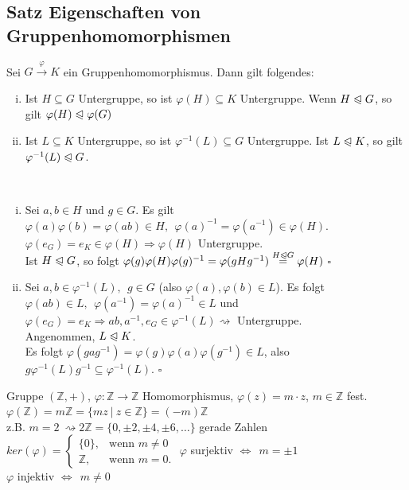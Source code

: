 \subsection{Satz Eigenschaften von Gruppenhomomorphismen}
\label{sub:satz_eigenschaften}
Sei $G\stackrel{\varphi}{\to}K $ ein Gruppenhomomorphismus. Dann gilt folgendes:
\begin{enumerate}[(i)]
	\item Ist $H\subseteq G$ Untergruppe, so ist $\varphi(H) \subseteq K$ Untergruppe. Wenn $H\trianglelefteqslant G$, so gilt $\varphi(H)\trianglelefteqslant\varphi(G)$
	\item Ist $L\subseteq K$ Untergruppe, so ist $\varphi^{-1}(L) \subseteq G$ Untergruppe. Ist $L\trianglelefteqslant K$, so gilt $\varphi^{-1}(L) \trianglelefteqslant G$.
\end{enumerate}
\newpage
{}\\
\begin{enumerate}[(i)]
	\item Sei $a,b\in H$ und $g\in G$. Es gilt $\varphi(a)\varphi(b)=\varphi(ab)\in H,~~\varphi(a)^{-1}=\varphi(a^{-1})\in \varphi(H) $. $\varphi(e_G)=e_K \in \varphi(H) \Rightarrow \varphi(H)$ Untergruppe.\\
	Ist $H\trianglelefteqslant G$, so folgt $\varphi(g)\varphi(H)\varphi(g)^{-1}=\varphi(gHg^{-1})\stackrel{H\trianglelefteqslant G}{=}\varphi(H)$
	\hfill $\square$
	\item Sei $a,b \in \varphi^{-1}(L),~~g \in G$ (also $\varphi(a),\varphi(b) \in L$). Es folgt $\varphi(ab)\in L,~~\varphi(a^{-1})=\varphi(a)^{-1}\in L$ und $\varphi(e_G)=e_K \Rightarrow ab, a^{-1},e_G \in \varphi^{-1}(L) \rightsquigarrow$ Untergruppe.\\
	Angenommen, $L\trianglelefteqslant K$.\\ Es folgt $\varphi(gag^{-1})=\varphi(g)\varphi(a)\varphi(g^{-1}) \in L$, also $g\varphi^{-1}(L)g^{-1} \subseteq \varphi^{-1}(L)$.
	\hfill $\square$
\end{enumerate}

Gruppe $(\mathds{Z},+)$, $\varphi: \mathds{Z} \to \mathds{Z} \text{ Homomorphismus, }\varphi(z)=m\cdot z$, $m \in \mathds{Z}$ fest.\\
$\varphi(\mathds{Z})=m\mathds{Z}=\{mz~|~z\in \mathds{Z}\}=(-m)\mathds{Z}$\\
z.B. $m=2~\rightsquigarrow 2\mathds{Z}=\{0,\pm 2,\pm 4,\pm 6,\dots\}$ gerade Zahlen\\
$ker(\varphi)=\left\{\begin{array}{cl} \{0\}, & \text{wenn }m\not=0\\ \mathds{Z}, & \text{wenn } m=0. \end{array}\right.$
$\varphi$ surjektiv $\Leftrightarrow~~m=\pm 1$\\
$\varphi$ injektiv $\Leftrightarrow~~m\not=0$\\

